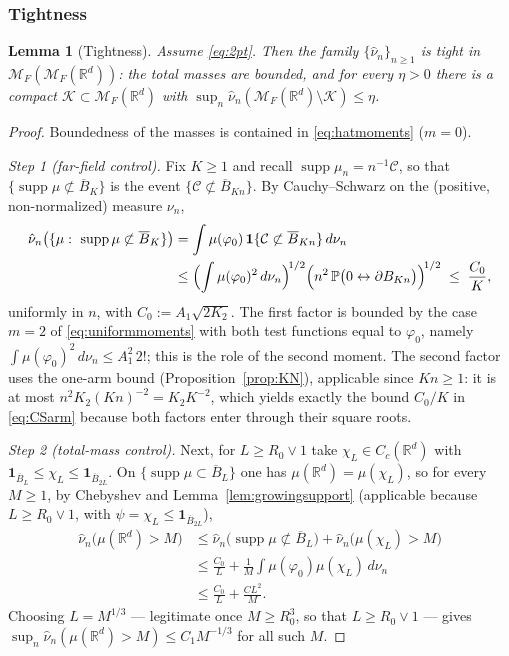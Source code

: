 \documentclass[11pt]{article}
\newtheorem{lemma}[theorem]{Lemma}
\theoremstyle{definition}
\theoremstyle{remark}
\newcommand{\R}{\mathbb{R}}
\newcommand{\bP}{\mathbb{P}}
\newcommand{\cM}{{\mathcal{M}_F(\R^d)}}          %
\newcommand{\cMM}{{\mathcal{M}_F(\mathcal{M}_F(\R^d))}}
\newcommand{\supp}{\operatorname{supp}}
\newcommand{\nuh}{\hat{\nu}}
\numberwithin{equation}{section}
\theoremstyle{plain}
\theoremstyle{definition}
\theoremstyle{remark}
\theoremstyle{plain}
\begin{document}
\subsubsection{Tightness}

\begin{lemma}[Tightness]\label{lem:tightness}
 Assume \eqref{eq:2pt}. Then the family
$\{\nuh_n\}_{n\ge1}$ is tight in $\cMM$: the total masses are bounded, and
for every $\eta>0$ there is a compact $\mathcal K\subset\cM$ with
$\sup_n\nuh_n(\cM\setminus\mathcal K)\le\eta$.
\end{lemma}

\begin{proof}
Boundedness of the masses is contained in \eqref{eq:hatmoments}
($m=0$).

\emph{Step 1 (far-field control).} Fix $K\ge1$ and recall $\supp\mu_n=n^{-1}\mathcal C$, so that
$\{\supp\mu\not\subset\overline B_K\}$ is the event $\{\mathcal C\not\subset\overline B_{Kn}\}$. By
Cauchy--Schwarz on the (positive, non-normalized) measure $\nu_n$,
\begin{equation}\label{eq:CSarm}
\begin{aligned}
\nuh_n\bigl(\{\mu:\ \supp\mu\not\subset\overline B_K\}\bigr)
&=\int\mu(\varphi_0)\,\mathbf 1\{\mathcal C\not\subset\overline B_{Kn}\}\,d\nu_n\\
&\le\Bigl(\int\mu(\varphi_0)^2\,d\nu_n\Bigr)^{\!1/2}
\Bigl(n^2\,\bP\bigl(0\leftrightarrow\partial B_{Kn}\bigr)\Bigr)^{\!1/2}
\;\le\;\frac{C_0}{K},
\end{aligned}
\end{equation}
uniformly in $n$, with $C_0:=A_1\sqrt{2K_2}$. The first factor is bounded by
the case $m=2$ of \eqref{eq:uniformmoments} with both test functions equal to
$\varphi_0$, namely $\int\mu(\varphi_0)^2\,d\nu_n\le A_1^2\,2!$; this is the role
of the second moment. The second factor uses the one-arm bound
(Proposition~\ref{prop:KN}), applicable since $Kn\ge1$: it is at most
$n^2K_2(Kn)^{-2}=K_2K^{-2}$, which yields exactly the bound $C_0/K$ in
\eqref{eq:CSarm} because both factors enter through their square roots.

\emph{Step 2 (total-mass control).} Next, for $L\ge R_0\vee1$ take $\chi_L\in C_c(\R^d)$ with
$\mathbf 1_{\overline B_L}\le\chi_L\le\mathbf 1_{\overline B_{2L}}$. On
$\{\supp\mu\subset\overline B_L\}$ one has $\mu(\R^d)=\mu(\chi_L)$, so for every
$M\ge1$, by Chebyshev and Lemma~\ref{lem:growingsupport} (applicable
because $L\ge R_0\vee1$, with $\psi=\chi_L\le\mathbf 1_{\overline B_{2L}}$),
\begin{align*}
\nuh_n\bigl(\mu(\R^d)>M\bigr)&
\le\nuh_n\bigl(\supp\mu\not\subset\overline B_L\bigr)
+\nuh_n\bigl(\mu(\chi_L)>M\bigr)\\
&\le\frac{C_0}{L}+\frac{1}{M}\int\mu(\varphi_0)\mu(\chi_L)\,d\nu_n\\
&\le\frac{C_0}{L}+\frac{C L^2}{M}.
\end{align*}
Choosing $L=M^{1/3}$ --- legitimate once $M\ge R_0^3$, so that $L\ge
R_0\vee1$ --- gives $\sup_n\nuh_n(\mu(\R^d)>M)\le C_1M^{-1/3}$ for all such
$M$.


\end{proof}
\end{document}
